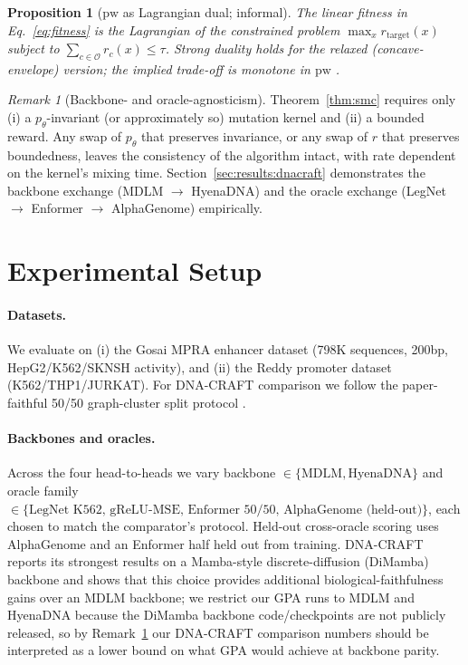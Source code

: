 \documentclass{article}
\newtheorem{proposition}{Proposition}
\theoremstyle{definition}
\theoremstyle{remark}
\newtheorem{remark}{Remark}
\newcommand{\gpa}{\textsc{GPA}\xspace}
\newcommand{\dnacraft}{\textsc{DNA-CRAFT}\xspace}
\begin{document}
\begin{proposition}[$\mathrm{pw}$ as Lagrangian dual; informal]\label{prop:lagrangian}
The linear fitness in Eq.~\ref{eq:fitness} is the Lagrangian of the constrained problem $\max_x r_{\mathrm{target}}(x)$ subject to $\sum_{c\in\mathcal{O}} r_c(x)\!\leq\!\tau$. Strong duality holds for the relaxed (concave-envelope) version; the implied trade-off is monotone in $\mathrm{pw}$ \citep{boyd2004convex}.
\end{proposition}

\begin{remark}[Backbone- and oracle-agnosticism]\label{rem:agnostic}
Theorem~\ref{thm:smc} requires only (i) a $p_\theta$-invariant (or approximately so) mutation kernel and (ii) a bounded reward. Any swap of $p_\theta$ that preserves invariance, or any swap of $r$ that preserves boundedness, leaves the consistency of the algorithm intact, with rate dependent on the kernel's mixing time. Section~\ref{sec:results:dnacraft} demonstrates the backbone exchange (MDLM $\!\to\!$ HyenaDNA) and the oracle exchange (LegNet $\!\to\!$ Enformer $\!\to\!$ AlphaGenome) empirically.
\end{remark}

\section{Experimental Setup}\label{sec:exp}

\paragraph{Datasets.}
We evaluate on (i) the Gosai MPRA enhancer dataset \citep{gosai2024mpra} (798K sequences, 200bp, HepG2/K562/SKNSH activity), and (ii) the Reddy promoter dataset \citep{reddy2026promoter} (K562/THP1/JURKAT). For \dnacraft{} comparison we follow the paper-faithful 50/50 graph-cluster split protocol \citep{dnacraft2026}.

\paragraph{Backbones and oracles.}
Across the four head-to-heads we vary backbone $\in\{\text{MDLM},\text{HyenaDNA}\}$ and oracle family $\in\{\text{LegNet K562},\,\text{gReLU-MSE},\,\text{Enformer 50/50},\,\text{AlphaGenome (held-out)}\}$, each chosen to match the comparator's protocol. Held-out cross-oracle scoring uses AlphaGenome and an Enformer half held out from training. \dnacraft{} reports its strongest results on a Mamba-style discrete-diffusion (DiMamba) backbone and shows that this choice provides additional biological-faithfulness gains over an MDLM backbone; we restrict our \gpa{} runs to MDLM and HyenaDNA because the DiMamba backbone code/checkpoints are not publicly released, so by Remark~\ref{rem:agnostic} our \dnacraft{} comparison numbers should be interpreted as a lower bound on what \gpa{} would achieve at backbone parity.
\end{document}

